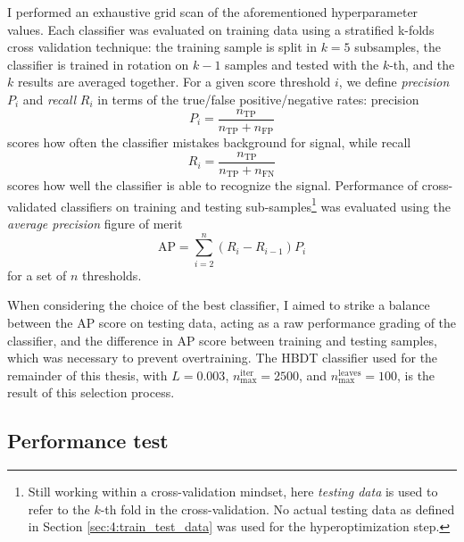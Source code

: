 I performed an exhaustive grid scan of the aforementioned hyperparameter values.
Each classifier was evaluated on training data using a stratified k-folds cross validation technique: the training sample is split in $k=5$ subsamples, the classifier is trained in rotation on $k-1$ samples and tested with the $k$-th, and the $k$ results are averaged together.
For a given score threshold $i$, we define \textit{precision} $P_i$ and \textit{recall} $R_i$ in terms of the true/false positive/negative rates: precision 
\begin{equation}
	P_i = \frac{n_\text{TP}}{n_\text{TP} + n_\text{FP}}
	\label{eq:4:precision}
\end{equation}
scores how often the classifier mistakes background for signal, while recall
\begin{equation}
	R_i = \frac{n_\text{TP}}{n_\text{TP} + n_\text{FN}}
	\label{eq:4:recall}
\end{equation}
scores how well the classifier is able to recognize the signal.
Performance of cross-validated classifiers on training and testing sub-samples\footnote{Still working within a cross-validation mindset, here \textit{testing data} is used to refer to the $k$-th fold in the cross-validation. No actual testing data as defined in Section \ref{sec:4:train_test_data} was used for the hyperoptimization step.} was evaluated using the \textit{average precision} figure of merit
\begin{equation}
	\text{AP} = \sum_{i=2}^{n} (R_i - R_{i-1})P_i
	\label{eq:4:average_prec}
\end{equation}
for a set of $n$ thresholds.

When considering the choice of the best classifier, I aimed to strike a balance between the AP score on testing data, acting as a raw performance grading of the classifier, and the difference in AP score between training and testing samples, which was necessary to prevent overtraining.
The HBDT classifier used for the remainder of this thesis, with $L=0.003$, $n_\text{max}^\text{iter}=2500$, and $n_\text{max}^\text{leaves}=100$, is the result of this selection process.

\subsection{Performance test}

